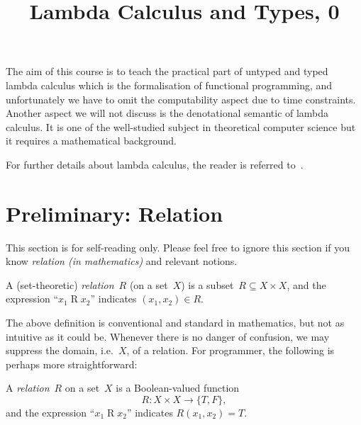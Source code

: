 \title{Lambda Calculus and Types, 0}

\begin{frame}
\maketitle
\end{frame}


The aim of this course is to teach the practical part of untyped and typed
lambda calculus which is the formalisation of functional programming,
and unfortunately we have to omit the computability aspect due to time
constraints. Another aspect we will not discuss is the denotational semantic of
lambda calculus. It is one of the well-studied subject in theoretical computer
science but it requires a mathematical background.


For further details about lambda calculus, the reader is referred
to~\cite{Barendregt1984,Barendregt1992}. 

\section{Preliminary: Relation}
This section is for self-reading only. Please feel free to ignore this section
if you know \emph{relation (in mathematics)} and relevant notions.

\begin{definition}
  A (set-theoretic) \emph{relation}~$R$ (on a set~$X$) is a subset~$R
  \subseteq X \times X$, and the expression ``$x_1 \mathbin{R} x_2$'' indicates
  $(x_1, x_2) \in R$.
\end{definition}
The above definition is conventional and standard in mathematics, but not as
intuitive as it could be. Whenever there is no danger of confusion, we may
suppress the domain, i.e.\ $X$, of a relation. For programmer, the following is
perhaps more straightforward:
\begin{definition}[Functional]
  A \emph{relation}~$R$ on a set~$X$ is a Boolean-valued function 
  \[
    R\colon X \times X \to \{T, F\},
  \]
  and the expression ``$x_1 \mathbin{R} x_2$'' indicates $R(x_1, x_2) = T$.
\end{definition}


